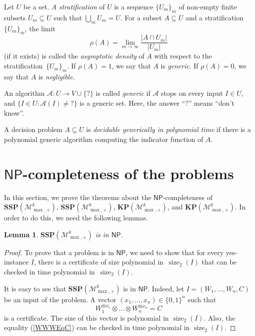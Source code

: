\documentclass[reqno,12pt]{amsart}
\newtheorem{lemma}{Lemma}
\theoremstyle{definition}
\newcommand{\NP}{\mathsf{NP}}
\newcommand{\MP}{\mathcal{M}_{\max, {+}}^k}
\newcommand{\MT}{\mathcal{M}_{\max, {\times}}^k}
\newcommand{\SSMPP}{\mathbf{SSP}(\MP)}
\newcommand{\SSMTP}{\mathbf{SSP}(\MT)}
\newcommand{\KMPP}{\mathbf{KP}(\MP)}
\newcommand{\KMTP}{\mathbf{KP}(\MT)}
\DeclareMathOperator{\size}{size}
\begin{document}
Let $U$ be a set. \textit{A stratification} of $U$ is a sequence $\{U_m\}_m$ of non-empty finite subsets $U_m \subseteq U$ such that $\bigcup_m U_m = U$. 
For a subset $A \subseteq U$ and a stratification~$\{U_m\}_m$, the limit $$\rho(A) = \lim_{m \to \infty} \frac{|A \cap U_m|}{|U_m|}$$ (if it exists) is called the \textit{asymptotic density} of $A$ with respect to the stratification~$\{U_m\}_m$.
If $\rho(A) = 1$, we say that $A$ is \textit{generic}.
If $\rho(A) = 0$, we say that $A$ is \textit{negligible}.

An algorithm $\mathcal{A}\colon U \to V \cup \{?\}$ is called \textit{generic} if $\mathcal{A}$ stops on every input $I \in U$, and $\{I \in U : \mathcal{A}(I) \neq {?}\}$ is a generic set.
Here, the answer ``?'' means ``don't know''.

A decision problem $A \subseteq U$ is \textit{decidable generically in polynomial time} if there is a polynomial generic algorithm computing the indicator function of $A$.


\section{\texorpdfstring{$\NP$}{NP}-completeness of the problems}

In this section, we prove the theorems about the $\NP$-completeness of $\SSMPP$, $\SSMTP$, $\KMPP$, and $\KMTP$.
In order to do this, we need the following lemmas.

\begin{lemma}\label{Lemma11}
    $\SSMPP$ is in $\NP$.
\end{lemma}

\begin{proof}
    To prove that a problem is in $\NP$, we need to show that for every yes-instance $I$, there is a certificate of size polynomial in~$\size_2(I)$ that can be checked in time polynomial in~$\size_2(I)$. 

    It is easy to see that $\SSMPP$ is in $\NP$. 
    Indeed, let $I = (W_1, \ldots, W_n, C)$ be an input of the problem. A vector $(x_1, \ldots, x_n) \in \{0, 1\}^n$ such that 
    \begin{equation}\label{WWWEqC}
        W_1^{\otimes x_1} \otimes \ldots \otimes  W_n^{\otimes x_n} = C
    \end{equation}
    is a certificate. The size of this vector is polynomial in $\size_2(I)$. Also, the equality (\ref{WWWEqC}) can be checked in time polynomial in $\size_2(I)$. 
\end{proof}
\end{document}

